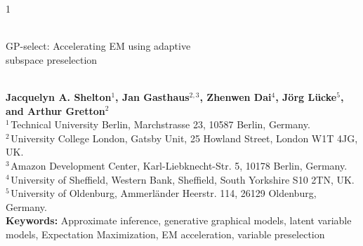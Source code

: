 \documentclass[12pt]{article}
\begin{document}
\hspace{13.9cm}1

\ \vspace{20mm}\\ 

{\LARGE GP-select: Accelerating EM using adaptive \\subspace preselection}

\ \\
{\bf \large Jacquelyn A. Shelton$^{\displaystyle 1}$, Jan Gasthaus$^{\displaystyle 2,3}$, Zhenwen Dai$^{\displaystyle 4}$, J\"org L\"{u}cke$^{\displaystyle 5}$, and Arthur Gretton$^{\displaystyle 2}$}\\
{$^{\displaystyle 1 \,}$Technical University Berlin, Marchstrasse 23, 10587 Berlin, Germany.}\\
{$^{\displaystyle 2 \,}$University College London, Gatsby Unit, 25 Howland Street, London W1T 4JG, UK.}\\
{$^{\displaystyle 3 \,}$Amazon Development Center, Karl-Liebknecht-Str. 5, 10178 Berlin, Germany.}\\
{$^{\displaystyle 4 \,}$University of Sheffield, Western Bank, Sheffield, South Yorkshire S10 2TN, UK.}\\
{$^{\displaystyle 5 \,}$University of Oldenburg, Ammerl\"ander Heerstr. 114, 26129 Oldenburg, Germany.}\\
%
{\bf Keywords:} Approximate inference, generative graphical models, latent variable models, Expectation Maximization, EM acceleration, variable preselection
\end{document}
